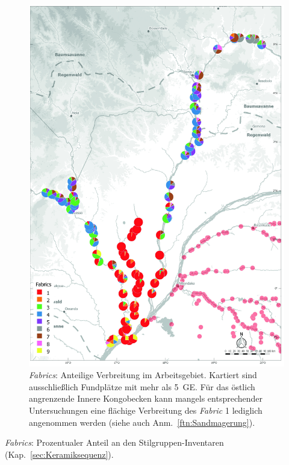 \begin{multicols}{2}
\begin{figure}[p]
	\centering
	\includegraphics[width=\textwidth]{fig/4_Fabrics_GIS.jpg}
	\caption{\textit{Fabrics}: Anteilige Verbreitung im Arbeitsgebiet. Kartiert sind ausschließlich Fundplätze mit mehr als 5~GE. Für das östlich angrenzende Innere Kongobecken \parencite[siehe][]{Wotzka.1995} kann mangels entsprechender Untersuchungen eine flächige Verbreitung des \textit{Fabric} 1 lediglich angenommen werden (siehe auch Anm.~\ref{ftn:Sandmagerung}).}
	\label{fig:Fabrics_Verbreitung}
\end{figure}

\begin{table}[!tb]
	\centering
	
	\caption{\textit{Fabrics}: Prozentualer Anteil an den Stilgruppen-Inventaren (Kap.~\ref{sec:Keramiksequenz}).}
	\label{tab:Fabrics_StilGr_Pct}
\end{table}


\end{multicols}
